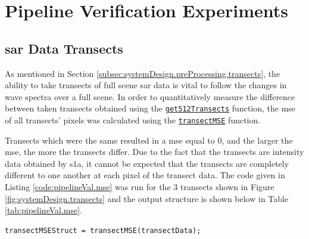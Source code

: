 \chapter{Pipeline Verification Experiments}
\label{chap:pipelineValidation}

\section{\acs{sar} Data Transects} \label{sec:pipelineVal.transects}

As mentioned in Section \ref{subsec:systemDesign.preProcessing.transects}, the ability to take transects of full scene \acs{sar} data is vital to follow the changes in wave spectra over a full scene. In order to quantitatively measure the difference between taken transects obtained using the \href{https://github.com/JNSRYA006/sar-parameter-extraction-pipeline/blob/main/functions/preprocess/get512Transects.m}{\lstinline{get512Transects}} function, the \ac{mse} of all transects' pixels was calculated using the \href{https://github.com/JNSRYA006/sar-parameter-extraction-pipeline/blob/main/functions/preprocess/get512Transects.m}{\lstinline{transectMSE}} function.

Transects which were the same resulted in a \acs{mse} equal to 0, and the larger the \acs{mse}, the more the transects differ. Due to the fact that the transects are intensity data obtained by \acs{s1a}, it cannot be expected that the transects are completely different to one another at each pixel of the transect data. The code given in Listing \ref{code:pipelineVal.mse} was run for the 3 transects shown in Figure \ref{fig:systemDesign.transects} and the output structure is shown below in Table \ref{tab:pipelineVal.mse}.

\begin{lstlisting}[caption={\textsc{Matlab} code used to calculate MSE values between all transects taken in Figure \ref{fig:systemDesign.transects}.},label={code:pipelineVal.mse}]
transectMSEStruct = transectMSE(transectData);
\end{lstlisting}


